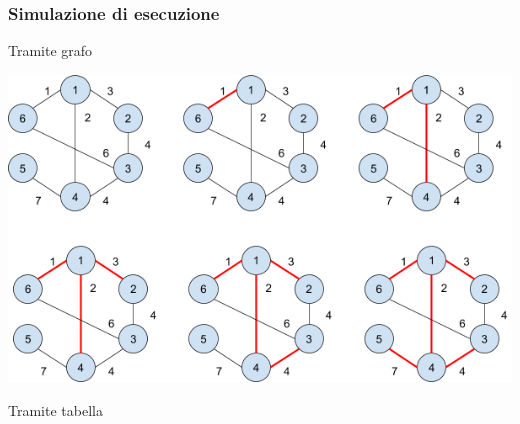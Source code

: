 \documentclass{article}
\begin{document}
\hypertarget{h.4n5zx1ni4b2b}{\subsubsection{\texorpdfstring{{Simulazione
di esecuzione}}{Simulazione di esecuzione}}\label{h.4n5zx1ni4b2b}}

{Tramite grafo}

{\includegraphics{images/image519.png}}

{}

{}

{}

{}

{}

{Tramite tabella}

{}

\protect\hypertarget{t.3d51b92c2ac905672959a85df610c27b5dc51a6c}{}{}\protect\hypertarget{t.43}{}{}
\end{document}
